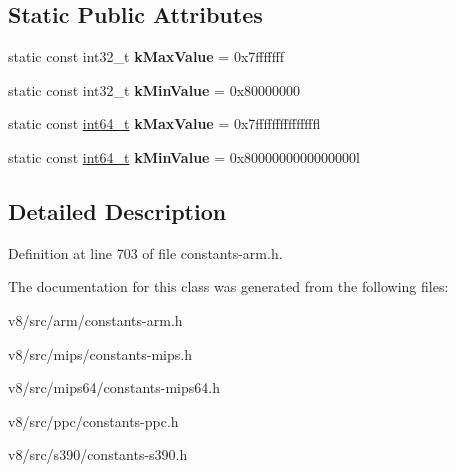 \subsection*{Static Public Attributes}
\begin{DoxyCompactItemize}
\item 
\mbox{\label{classv8_1_1internal_1_1Registers_a07435a8d8060dc8bfdc18d1ffbe1d10d}} 
static const int32\+\_\+t {\bfseries k\+Max\+Value} = 0x7fffffff
\item 
\mbox{\label{classv8_1_1internal_1_1Registers_a977757720ff82e6ba769664028b5c014}} 
static const int32\+\_\+t {\bfseries k\+Min\+Value} = 0x80000000
\item 
\mbox{\label{classv8_1_1internal_1_1Registers_a14c98f9b0700cc0d0469cf55b68b07f5}} 
static const \mbox{\hyperlink{classint64__t}{int64\+\_\+t}} {\bfseries k\+Max\+Value} = 0x7fffffffffffffffl
\item 
\mbox{\label{classv8_1_1internal_1_1Registers_acede0eeb70488c436626ca92303d2072}} 
static const \mbox{\hyperlink{classint64__t}{int64\+\_\+t}} {\bfseries k\+Min\+Value} = 0x8000000000000000l
\end{DoxyCompactItemize}


\subsection{Detailed Description}


Definition at line 703 of file constants-\/arm.\+h.



The documentation for this class was generated from the following files\+:\begin{DoxyCompactItemize}
\item 
v8/src/arm/constants-\/arm.\+h\item 
v8/src/mips/constants-\/mips.\+h\item 
v8/src/mips64/constants-\/mips64.\+h\item 
v8/src/ppc/constants-\/ppc.\+h\item 
v8/src/s390/constants-\/s390.\+h\end{DoxyCompactItemize}
